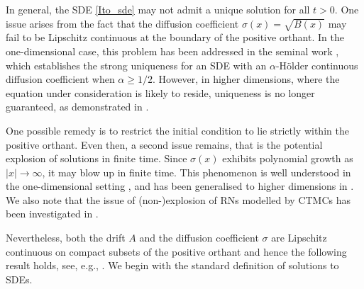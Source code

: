 \documentclass[10pt,a4paper]{amsart}
\theoremstyle{definition}
\theoremstyle{remark}
\theoremstyle{consequence}
\numberwithin{equation}{section}
\begin{document}
In general, the SDE \eqref{Ito_sde} may not admit a unique solution for all $t > 0$. One issue arises from the fact that the diffusion coefficient  $\sigma (x) = \sqrt{B (x)}$ may fail to be Lipschitz continuous at the boundary of the positive orthant. In the one-dimensional case, this problem has been addressed in the seminal work \cite{yamada1971uniqueness},  which establishes the strong uniqueness for an SDE with an $\alpha$-H\"{o}lder continuous diffusion coefficient when $\alpha \geq 1/2$. However, in higher dimensions, where the equation under consideration is likely to reside, uniqueness is no longer guaranteed, as demonstrated in \cite{swart20012}. 

One possible remedy is to restrict the initial condition to lie strictly within the positive orthant. Even then, a second issue remains, that is the potential explosion of solutions in finite time. Since $\sigma (x)$ exhibits polynomial growth as $|x| \to \infty$, it may blow up in finite time. This phenomenon is well understood in the one-dimensional setting \cite{feller1954diffusion}, and has been generalised to higher dimensions in \cite{khasminskii1960ergodic}. We also note that the issue of (non-)explosion of RNs modelled by CTMCs has been investigated in \cite{non-expl}.

Nevertheless, both the drift  $A$ and the diffusion coefficient  $\sigma$ are Lipschitz continuous on compact subsets of the positive orthant and hence the following result holds, see, e.g., \cite{ikeda1989stochastic}. We begin with the standard definition of solutions to SDEs.
\end{document}
